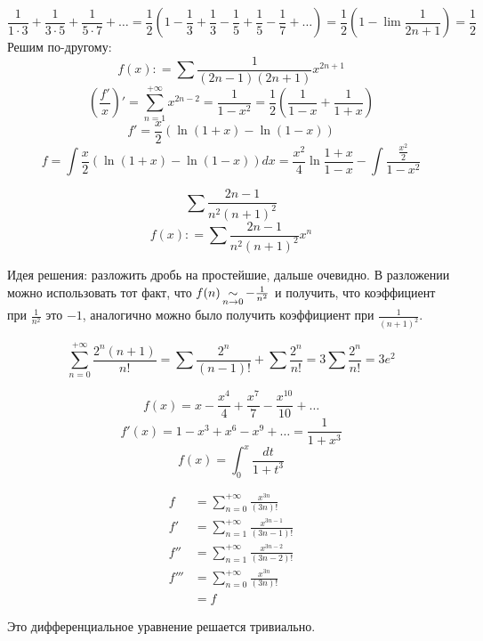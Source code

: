 \begin{exercise}[2968]
    \[\frac{1}{1\cdot 3} + \frac{1}{3\cdot 5} + \frac{1}{5\cdot 7} + \dots = \frac{1}{2}\left( 1 - \frac{1}{3} + \frac{1}{3} - \frac{1}{5} + \frac{1}{5} - \frac{1}{7} + \dots \right) = \frac{1}{2}\left(1 - \lim \frac{1}{2n + 1}\right) = \frac{1}{2}\]
    Решим по-другому:
    \[f(x) : = \sum \frac{1}{(2n - 1)(2n + 1)}x^{2n + 1}\]
    \[\left(\frac{f'}{x}\right)' =\sum_{n = 1}^{ +\infty} x^{2n - 2} = \frac{1}{1 - x^2} = \frac{1}{2}\left( \frac{1}{1 - x} + \frac{1}{1 + x} \right)\]
    \[f' = \frac{x}{2}\left( \ln(1 + x) - \ln(1 - x) \right)\]
    \[f =\int \frac{x}{2}(\ln(1 + x) -\ln(1 - x))dx = \frac{x^2}{4}\ln \frac{1 + x}{1 - x} -\int \frac{\frac{x^2}{2}}{1 - x^2}\]
\end{exercise}

\begin{exercise}[2993]
    \[\sum \frac{2n - 1}{n^2(n + 1)^2} \]
    \[f(x) : = \sum \frac{2n - 1}{n^2(n + 1)^2} x^n\]

    Идея решения: разложить дробь на простейшие, дальше очевидно. В разложении можно использовать тот факт, что \(f(n) \operatorname*{\sim}\limits_{n\to 0} - \frac{1}{n^2}\) и получить, что коэффициент при \(\frac{1}{n^2}\) это \( - 1\), аналогично можно было получить коэффициент при \(\frac{1}{(n + 1)^2}\).
\end{exercise}

\begin{exercise}[2996]
    \[\sum_{n = 0}^{+\infty} \frac{2^n(n + 1)}{n!} = \sum \frac{2^n}{(n - 1)!} + \sum \frac{2^n}{n!} = 3 \sum \frac{2^n}{n!} = 3e^2\]
\end{exercise}

\begin{exercise}[3014]
    \[f(x) = x - \frac{x^4}{4} + \frac{x^7}{7} - \frac{x^{10}}{10} + \dots \]
    \[f'(x) = 1 - x^3 + x^6 - x^9 + \dots = \frac{1}{1 + x^3}\]
    \[f(x) = \int_0^x \frac{dt}{1 + t^3}\]
\end{exercise}

\begin{exercise}
    \begin{align*}
        f    & = \sum_{n = 0}^{+\infty} \frac{x^{3n}}{(3n)!}         \\
        f'   & = \sum_{n = 1}^{+\infty} \frac{x^{3n - 1}}{(3n - 1)!} \\
        f''  & = \sum_{n = 1}^{+\infty} \frac{x^{3n - 2}}{(3n - 2)!} \\
        f''' & = \sum_{n = 0}^{+\infty} \frac{x^{3n}}{(3n)!}         \\
             & = f
    \end{align*}

    Это дифференциальное уравнение решается тривиально.
\end{exercise}

